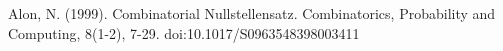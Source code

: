 \documentclass[12pt]{article}
\newcommand{\N}{\mathbb{N}}
\DeclarePairedDelimiter\ceil{\lceil}{\rceil}
\newtheorem{cor}[thm]{Corollary}
\theoremstyle{definition}
\begin{document}
	
	\begin{thebibliography}{100}
		 Alon, N. (1999). Combinatorial Nullstellensatz. Combinatorics, Probability and Computing, 8(1-2), 7-29. doi:10.1017/S0963548398003411
	\end{thebibliography}
	
\end{document}
